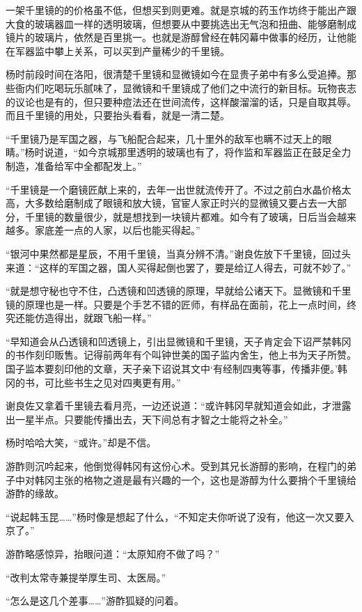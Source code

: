 一架千里镜的的价格虽不低，但想买到则更难。就是京城的药玉作坊终于能出产跟大食的玻璃器皿一样的透明玻璃，但想要从中要挑选出无气泡和扭曲、能够磨制成镜片的玻璃片，依然是百里挑一。也就是游醇曾经在韩冈幕中做事的经历，让他能在军器监中攀上关系，可以买到产量稀少的千里镜。

杨时前段时间在洛阳，很清楚千里镜和显微镜如今在显贵子弟中有多么受追捧。那些衙内们吃喝玩乐腻味了，显微镜和千里镜成了他们之中流行的新目标。玩物丧志的议论也是有的，但只要种痘法还在世间流传，这样酸溜溜的话，只是自取其辱。而且千里镜的用处，只要抬头看看，就是一清二楚。

“千里镜乃是军国之器，与飞船配合起来，几十里外的敌军也瞒不过天上的眼睛。”杨时说道，“如今京城那里透明的玻璃也有了，将作监和军器监正在鼓足全力制造，准备给军中全都配发上。”

“千里镜是一个磨镜匠献上来的，去年一出世就流传开了。不过之前白水晶价格太高，大多数给磨制成了眼镜和放大镜，官宦人家正时兴的显微镜又要占去一大部分，千里镜的数量很少，就是想找到一块镜片都难。如今有了玻璃，日后当会越来越多。家底差一点的人家，以后也能买得起。”

“银河中果然都是星辰，不用千里镜，当真分辨不清。”谢良佐放下千里镜，回过头来道：“这样的军国之器，国人买得起倒也罢了，要是给辽人得去，可就不妙了。”

“就是想守秘也守不住，凸透镜和凹透镜的原理，早就给公诸天下。显微镜和千里镜的原理也是一样。只要是个手艺不错的匠师，有样品在面前，花上一点时间，终究还能仿造得出，就跟飞船一样。”

“早知道会从凸透镜和凹透镜上，引出显微镜和千里镜，天子肯定会下诏严禁韩冈的书作刻印贩售。记得前两年有个叫钟世美的国子监内舍生，他上书为天子所赞。国子监本要刻印他的文章，天子亲下诏说其文中‘有经制四夷等事，传播非便。'韩冈的书，可比些书生之见对四夷更有用。”

谢良佐又拿着千里镜去看月亮，一边还说道：“或许韩冈早就知道会如此，才泄露出一星半点。只要能传播出去，天下间总有才智之士能将之补全。”

杨时哈哈大笑，“或许。”却是不信。

游酢则沉吟起来，他倒觉得韩冈有这份心术。受到其兄长游醇的影响，在程门的弟子中对韩冈主张的格物之道是最有兴趣的一个，这也是游醇为什么要捎个千里镜给游酢的缘故。

“说起韩玉昆……”杨时像是想起了什么，“不知定夫你听说了没有，他这一次又要入京了。”

游酢略感惊异，抬眼问道：“太原知府不做了吗？”

“改判太常寺兼提举厚生司、太医局。”

“怎么是这几个差事……”游酢狐疑的问着。

